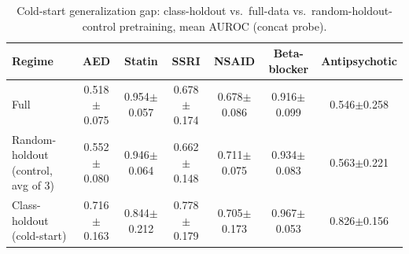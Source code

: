 \begin{table}[t]
\caption{Cold-start generalization gap: class-holdout vs.\ full-data vs.\ random-holdout-control pretraining, mean AUROC (concat probe).}
\label{tab:coldstart}
\begin{center}\small
\begin{tabular}{lcccccc}
\toprule
Regime & AED & Statin & SSRI & NSAID & Beta-blocker & Antipsychotic \\
\midrule
Full & 0.518$\pm$0.075 & 0.954$\pm$0.057 & 0.678$\pm$0.174 & 0.678$\pm$0.086 & 0.916$\pm$0.099 & 0.546$\pm$0.258 \\
Random-holdout (control, avg of 3) & 0.552$\pm$0.080 & 0.946$\pm$0.064 & 0.662$\pm$0.148 & 0.711$\pm$0.075 & 0.934$\pm$0.083 & 0.563$\pm$0.221 \\
Class-holdout (cold-start) & 0.716$\pm$0.163 & 0.844$\pm$0.212 & 0.778$\pm$0.179 & 0.705$\pm$0.173 & 0.967$\pm$0.053 & 0.826$\pm$0.156 \\
\bottomrule
\end{tabular}\end{center}\end{table}